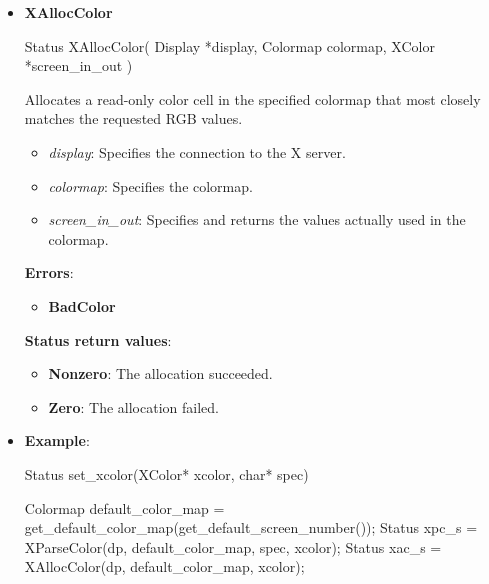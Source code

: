 \documentclass{report}
\begin{document}
\begin{itemize}
\begin{itemize}
                \item \textbf{exact\_def\_return}: Returns the exact color value for later use and sets the \textbf{DoRed}, \textbf{DoGreen}, and \textbf{DoBlue} flags.
            \end{itemize}
            \bigbreak \noindent
            \textbf{Errors}:
            \begin{itemize}
                \item \textbf{BadColor}
            \end{itemize}
            \bigbreak \noindent
            \textbf{Status return values}:
            \begin{itemize}
                \item \textbf{Nonzero}: The color specification was resolved.
                \item \textbf{Zero}: The color specification was not resolved.
            \end{itemize}
        \item \textbf{XAllocColor}
            \bigbreak \noindent 
            \begin{cppcode}
                Status XAllocColor(
                    Display *display,
                    Colormap colormap,
                    XColor *screen_in_out
                )
            \end{cppcode}
            \bigbreak \noindent
            Allocates a read-only color cell in the specified colormap that most closely matches the requested RGB values.
            \begin{itemize}
                \item \textit{display}: Specifies the connection to the X server.
                \item \textit{colormap}: Specifies the colormap.
                \item \textit{screen\_in\_out}: Specifies and returns the values actually used in the colormap.
            \end{itemize}
            \bigbreak \noindent
            \textbf{Errors}:
            \begin{itemize}
                \item \textbf{BadColor}
            \end{itemize}
            \bigbreak \noindent
            \textbf{Status return values}:
            \begin{itemize}
                \item \textbf{Nonzero}: The allocation succeeded.
                \item \textbf{Zero}: The allocation failed.
            \end{itemize}
        \item \textbf{Example}:
            \bigbreak \noindent 
            \begin{cppcode}
                Status set_xcolor(XColor* xcolor, char* spec) {
                    Colormap default_color_map = get_default_color_map(get_default_screen_number());
                    Status xpc_s = XParseColor(dp, default_color_map, spec, xcolor);
                    Status xac_s = XAllocColor(dp, default_color_map, xcolor);

}
\end{cppcode}
\end{itemize}
\end{document}
